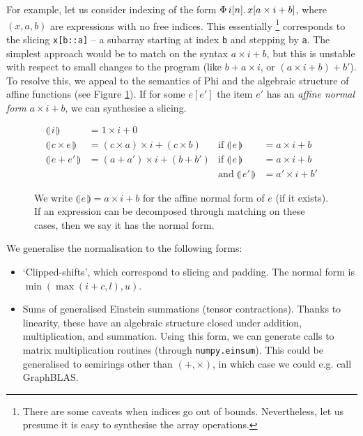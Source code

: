 For example, let us consider indexing of the form $\Phi\, {i}[{n}] \ldotp {x[a \times i + b]}$, where $(x, a, b)$ are expressions with no free indices. This essentially%
\footnote{
There are some caveats when indices go out of bounds. Nevertheless, let us presume it is easy to synthesise the array operations.}
corresponds to the slicing \texttt{x[b::a]} -- a subarray starting at index \texttt{b} and stepping by \texttt{a}.
The simplest approach would be to match on the syntax $a \times i + b$, but this is unstable with respect to small changes to the program (like $b + a \times i$, or $(a \times i + b) + b'$).
To resolve this, we appeal to the semantics of Phi and the algebraic structure of affine functions (see Figure \ref{fig:affine-normal-forms}). 
If for some $e[e']$ the item $e'$ has an \textit{affine normal form} $a \times i + b$, we can synthesise a slicing.

\newcommand{\norma}[1]{\llparenthesis \,{#1}\, \rrparenthesis}
\begin{figure}
    \centering
\begin{align*}
\norma{i} &= 1 \times i + 0 \\
\norma{c\times e} &= (c \times a) \times i + (c \times b)
& \text{if } \norma{e} &= a \times i + b \\
\norma{e + e'} &= (a + a') \times i + (b + b')
& \text{if } \norma{e} &= a \times i + b \\
&& \text{and } \norma{e'} &= a' \times i + b'
\end{align*}
    \caption{We write $\norma{e} = a \times i + b$ for the affine normal form of $e$ (if it exists). If an expression can be decomposed through matching on these cases, then we say it has the normal form.}
    \label{fig:affine-normal-forms}
\end{figure}

We generalise the normalisation to the following forms: \begin{itemize}
    \item `Clipped-shifts', which correspond to slicing and padding. The normal form is $\min(\max(i + c, l), u)$.
    \item Sums of generalised Einstein summations (tensor contractions). Thanks to linearity, these have an algebraic structure closed under addition, multiplication, and summation. Using this form, we can generate calls to matrix multiplication routines (through \texttt{numpy.einsum}). This could be generalised to semirings other than $(+, \times)$, in which case we could e.g. call GraphBLAS.
\end{itemize}

